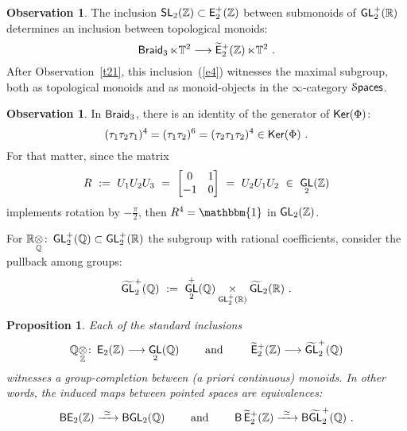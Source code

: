 \documentclass{amsart}
\newtheorem{prop}[theorem]{Proposition}
\theoremstyle{definition}
\newtheorem{observation}[theorem]{Observation}
\theoremstyle{remark}
\DeclareMathOperator{\Ker}{\sf Ker}
\DeclareMathOperator{\Spaces}{\cS\mathsf{paces}}
\def\ot{\otimes}
\newcommand{\w}{\widetilde}
\newcommand{\xra}{\xrightarrow}
\def\QQ{\mathbb Q}\def\RR{\mathbb R}\def\SS{\mathbb S}\def\TT{\mathbb T}
\def\sE{\mathsf E}\def\sF{\mathsf F}\def\sG{\mathsf G}\def\sH{\mathsf H}
\DeclareMathOperator{\uno}{\mathbbm{1}}
\DeclareMathOperator{\Braid}{{\sf Braid}_3}
\DeclareMathOperator{\Ebraid}{\w{\sf E}_{2}^{+}(\ZZ)}
\DeclareMathOperator{\GL}{\sf GL}
\DeclareMathOperator{\SL}{\sf SL}
\DeclareMathOperator{\EZ}{\sE_2(\ZZ)}
\DeclareMathOperator{\EpZ}{\sE^+_2(\ZZ)}
\begin{document}
\begin{observation}
\label{t39}
The inclusion $\SL_2(\ZZ)\subset \EpZ$ between submonoids of $\GL_2^+(\RR)$ determines an inclusion between topological monoids:
\begin{equation}
\label{e4}
\Braid \ltimes \TT^2
\longrightarrow
\Ebraid \ltimes \TT^2 
~.
\end{equation}
After Observation~\ref{t21}, this inclusion~(\ref{e4}) witnesses the maximal subgroup, both as topological monoids and as monoid-objects in the $\infty$-category $\Spaces$.

\end{observation}

































\begin{observation}
In $\Braid$, there is an identity of the generator of $\Ker(\Phi)$:
\[
(\tau_{1} \tau_{2} \tau_{1})^4 
=
( \tau_{1} \tau_{2})^6
=
(\tau_{2} \tau_{1} \tau_{2})^4
\in {\sf Ker}(\Phi)
~.
\]
For that matter, since the matrix
\begin{equation}
\label{e64}
R~:=~ U_1 U_2 U_3 ~=~ 
\begin{bmatrix}
0 & 1 
\\
-1 & 0
\end{bmatrix}
~=~
U_2 U_1 U_2
~\in~\GL_2(\ZZ)
\end{equation}
implements rotation by $-\frac{\pi}{2}$, 
then $R^4 = \uno$ in $\GL_2(\ZZ)$.

\end{observation}



For $\RR\underset{\QQ}\ot \colon \GL_2^+(\QQ)\subset \GL_2^+(\RR)$ the subgroup with rational coefficients, consider the pullback among groups:
\[
\w{\GL}_2^+(\QQ)
~:=~
\GL_2^+(\QQ)
\underset{
\GL_2^+(\RR)
}
\times
\w{\GL}_2(\RR)
~.
\]
\begin{prop}
\label{t59}
Each of the standard inclusions
\[
\QQ\underset{\ZZ}\ot
\colon
\EZ
\longrightarrow
\GL_2(\QQ)
\qquad
\text{ and }
\qquad
\Ebraid
\longrightarrow
\w{\GL}_2^+(\QQ)
\]
witnesses a group-completion between (a priori continuous) monoids.
In other words, the induced maps between pointed spaces are equivalences:
\[
{\sf BE}_2(\ZZ)
\xra{~\simeq~}
{\sf BGL}_2(\QQ)
\qquad
\text{ and }
\qquad
\sB
\Ebraid
\xra{~\simeq~}
{\sf B \w{GL}}_2^+(\QQ)
~.
\]

\end{prop}
\end{document}
